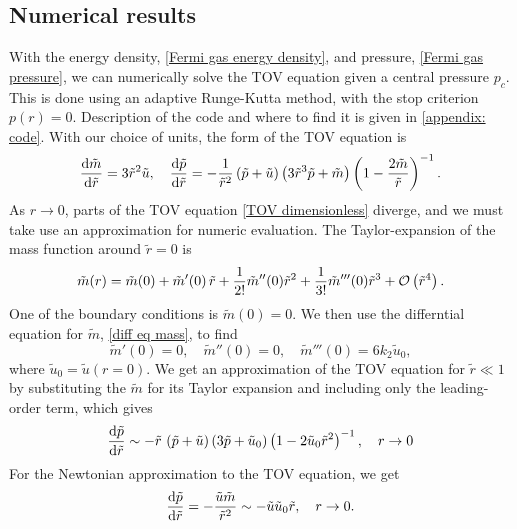 \subsection{Numerical results}

With the energy density, \autoref{Fermi gas energy density}, and pressure, \autoref{Fermi gas pressure}, we can numerically solve the TOV equation given a central pressure $p_c$. 
This is done using an adaptive Runge-Kutta method, with the stop criterion $p(r) = 0$.
Description of the code and where to find it is given in \autoref{appendix: code}.
With our choice of units, the form of the TOV equation is
%
\begin{align}
    \diff{\tilde m}{\tilde r} 
    = 3 \tilde r^2 \tilde u, \quad
    \diff{\tilde p}{\tilde r} 
     = - \frac{1}{\tilde r^2} \left(\tilde p + \tilde u\right) 
    \left(3  \tilde r^3 \tilde p + \tilde m\right) 
    \left(1 - \frac{2 \tilde m}{\tilde r}\right)^{-1}.
\end{align}
%
As $r \rightarrow 0$, parts of the TOV equation \autoref{TOV dimensionless} diverge, and we must take use an approximation for numeric evaluation.
The Taylor-expansion of the mass function around $\tilde r = 0$ is
%
\begin{equation}
    \tilde m(r) = \tilde m(0) + \tilde m'(0) \, \tilde r + \frac{1}{2!} \tilde m''(0) \tilde r^2
    + \frac{1}{3!} \tilde m'''(0) \tilde r^3 + \mathcal O\left(\tilde r^4\right).
\end{equation}
%
One of the boundary conditions is $\tilde m(0) = 0$.
We then use the differntial equation for $\tilde m$, \autoref{diff eq mass}, to find
%
\begin{equation}
    \tilde m'(0) = 0, \quad
    \tilde m''(0) = 0, \quad
    \tilde m'''(0) = 6 k_2 \tilde u_0,
\end{equation}
%
where $\tilde u_0 = \tilde u(r = 0)$.
We get an approximation of the TOV equation for $\tilde r \ll 1$ by substituting the $\tilde m$ for its Taylor expansion and including only the leading-order term, which gives
%
\begin{equation}
    \diff{\tilde p}{\tilde r}
    \sim - \tilde r \, \left(\tilde p + \tilde u\right)
    \left( 3 \tilde p + \tilde u_0  \right)
    \left(1 - 2 \tilde u_0 \tilde r^2\right)^{-1}, \quad r\rightarrow 0
\end{equation}
%
For the Newtonian approximation to the TOV equation, we get
%
\begin{equation}
    \diff{\tilde p}{\tilde r} = -\frac{\tilde u \tilde m}{\tilde r^2}
    \sim - \tilde u \tilde u_0 \tilde r,  \quad r\rightarrow 0.
\end{equation}



